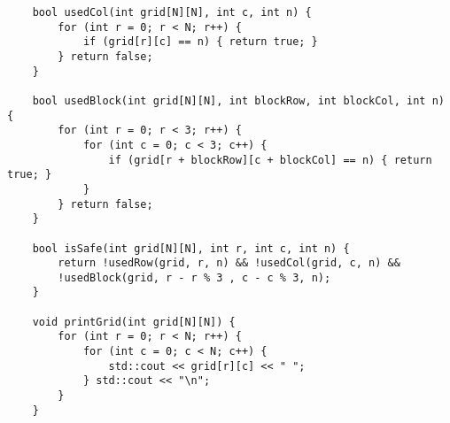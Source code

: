 \documentclass[11pt]{amsart}
\begin{document}
\begin{verbatim}
	bool usedCol(int grid[N][N], int c, int n) {
	    for (int r = 0; r < N; r++) {
	        if (grid[r][c] == n) { return true; }
	    } return false;
	}

	bool usedBlock(int grid[N][N], int blockRow, int blockCol, int n) {
	    for (int r = 0; r < 3; r++) {
	        for (int c = 0; c < 3; c++) {
	            if (grid[r + blockRow][c + blockCol] == n) { return true; }
	        }
	    } return false;
	}

	bool isSafe(int grid[N][N], int r, int c, int n) {
	    return !usedRow(grid, r, n) && !usedCol(grid, c, n) &&
	    !usedBlock(grid, r - r % 3 , c - c % 3, n);
	}

	void printGrid(int grid[N][N]) {
	    for (int r = 0; r < N; r++) {
	        for (int c = 0; c < N; c++) {
	            std::cout << grid[r][c] << " ";
	        } std::cout << "\n";
	    }
	}


\end{verbatim}
\end{document}

